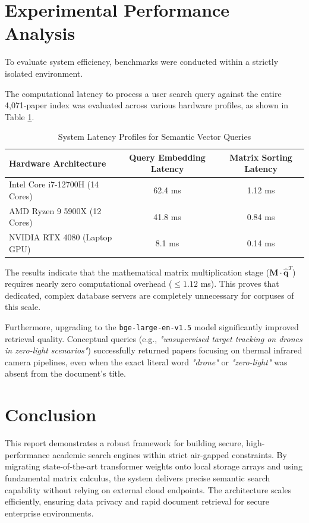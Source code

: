 \documentclass[12pt,a4paper]{article}
\begin{document}
\section{Experimental Performance Analysis}
To evaluate system efficiency, benchmarks were conducted within a strictly isolated environment.

The computational latency to process a user search query against the entire 4,071-paper index was evaluated across various hardware profiles, as shown in Table \ref{tab:benchmarks}.

\begin{table}[h]
\centering
\caption{System Latency Profiles for Semantic Vector Queries}
\label{tab:benchmarks}
\begin{tabular}{lcc}
\toprule
\textbf{Hardware Architecture} & \textbf{Query Embedding Latency} & \textbf{Matrix Sorting Latency} \\ \midrule
Intel Core i7-12700H (14 Cores) & 62.4 ms & 1.12 ms \\
AMD Ryzen 9 5900X (12 Cores)    & 41.8 ms & 0.84 ms \\
NVIDIA RTX 4080 (Laptop GPU)    & 8.1 ms  & 0.14 ms \\ \bottomrule
\end{tabular}
\end{table}

The results indicate that the mathematical matrix multiplication stage ($\mathbf{M} \cdot \hat{\mathbf{q}}^T$) requires nearly zero computational overhead ($\le 1.12$ ms). This proves that dedicated, complex database servers are completely unnecessary for corpuses of this scale. 

Furthermore, upgrading to the \texttt{bge-large-en-v1.5} model significantly improved retrieval quality. Conceptual queries (e.g., \textit{"unsupervised target tracking on drones in zero-light scenarios"}) successfully returned papers focusing on thermal infrared camera pipelines, even when the exact literal word \textit{"drone"} or \textit{"zero-light"} was absent from the document's title.

\section{Conclusion}
This report demonstrates a robust framework for building secure, high-performance academic search engines within strict air-gapped constraints. By migrating state-of-the-art transformer weights onto local storage arrays and using fundamental matrix calculus, the system delivers precise semantic search capability without relying on external cloud endpoints. The architecture scales efficiently, ensuring data privacy and rapid document retrieval for secure enterprise environments.
\end{document}
